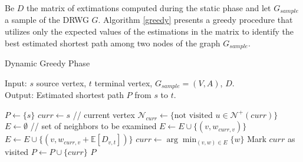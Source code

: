 Be $D$ the matrix of extimations computed during the static phase and let $G_{sample}$ a sample of the DRWG $G$. Algorithm \ref{greedy} presents a greedy procedure that utilizes only the expected values of the estimations in the matrix to identify the best estimated shortest path among two nodes of the graph $G_{sample}$.

\begin{algorithm}
	\caption{Dynamic Greedy Phase} 
	\label{greedy}
    Input: $s$ source vertex, $t$ terminal vertex, $G_{sample} = (V,A)$, $D$.  \\
    Output: Estimated shortest path $P$ from $s$ to $t$.
	\begin{algorithmic}[1]
        \State $P \gets \{s\}$
        \State $curr \gets s$ // current vertex
            \State $\mathcal{N}_{curr} \gets \{\text{not visited } u \in \mathcal{N^+}(curr)\}$
            \State $E \gets \emptyset$ // set of neighbors to be examined
                    \State $E \gets E \cup \{(v, w_{curr,v})\}$
                \Else
                    \State $E \gets E \cup \{(v, w_{curr,v} + \mathbb{E}[D_{v,t}])\}$
                \EndIf
            \EndFor
            \State $curr \gets \arg\min_{(v,w) \in E} \{w\}$
            \State Mark $curr$ as visited
            \State $P \gets P \cup \{curr\}$
        \EndWhile
        \State \Return $P$
	\end{algorithmic} 
\end{algorithm}
